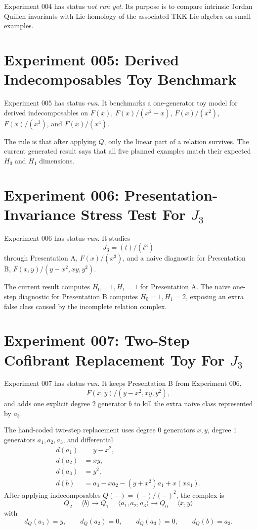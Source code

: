 Experiment 004 has status \emph{not run yet}. Its purpose is to compare
intrinsic Jordan Quillen invariants with Lie homology of the associated TKK
Lie algebra on small examples.

\section{Experiment 005: Derived Indecomposables Toy Benchmark}

Experiment 005 has status \emph{run}. It benchmarks a one-generator toy model
for derived indecomposables on \(F(x)\), \(F(x)/(x^2-x)\), \(F(x)/(x^2)\),
\(F(x)/(x^3)\), and \(F(x)/(x^4)\).

The rule is that after applying \(Q\), only the linear part of a relation
survives. The current generated result says that all five planned examples
match their expected \(H_0\) and \(H_1\) dimensions.

\section{\texorpdfstring{Experiment 006: Presentation-Invariance Stress Test For \(J_3\)}{Experiment 006: Presentation-Invariance Stress Test For J3}}

Experiment 006 has status \emph{run}. It studies
\[
  J_3 = (t)/(t^3)
\]
through Presentation A, \(F(x)/(x^3)\), and a naive diagnostic for Presentation
B, \(F(x,y)/(y-x^2, xy, y^2)\).

The current result computes \(H_0=1, H_1=1\) for Presentation A. The naive
one-step diagnostic for Presentation B computes \(H_0=1, H_1=2\), exposing an
extra false class caused by the incomplete relation complex.

\section{\texorpdfstring{Experiment 007: Two-Step Cofibrant Replacement Toy For \(J_3\)}{Experiment 007: Two-Step Cofibrant Replacement Toy For J3}}

Experiment 007 has status \emph{run}. It keeps Presentation B from Experiment
006,
\[
  F(x,y)/(y-x^2, xy, y^2),
\]
and adds one explicit degree \(2\) generator \(b\) to kill the extra naive
class represented by \(a_3\).

The hand-coded two-step replacement uses degree \(0\) generators \(x,y\),
degree \(1\) generators \(a_1,a_2,a_3\), and differential
\[
\begin{aligned}
  d(a_1) &= y-x^2,\\
  d(a_2) &= xy,\\
  d(a_3) &= y^2,\\
  d(b) &= a_3 - x a_2 - (y+x^2)a_1 + x(xa_1).
\end{aligned}
\]
After applying indecomposables \(Q(-)=(-)/(-)^2\), the complex is
\[
  Q_2=\langle b\rangle \longrightarrow
  Q_1=\langle a_1,a_2,a_3\rangle \longrightarrow
  Q_0=\langle x,y\rangle
\]
with
\[
  d_Q(a_1)=y,\qquad d_Q(a_2)=0,\qquad d_Q(a_3)=0,\qquad d_Q(b)=a_3.
\]

